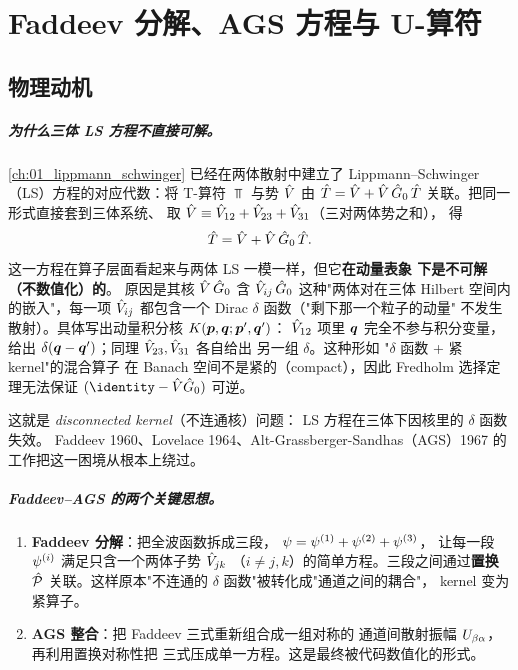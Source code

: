 
\chapter{Faddeev 分解、AGS 方程与 U-算符}
\label{ch:04_faddeev_ags}

\section{物理动机}
\label{sec:ch04-motivation}

\paragraph{为什么三体 LS 方程不直接可解。}
\cref{ch:01_lippmann_schwinger} 已经在两体散射中建立了 Lippmann–Schwinger
（LS）方程的对应代数：将 T-算符 \(\Top\) 与势 \(\hat{V}\) 由
\(\hat{T} = \hat{V} + \hat{V}\,\hat{G}_0\,\hat{T}\) 关联。把同一形式直接套到三体系统、
取 \(\hat{V} \equiv \hat{V}_{12} + \hat{V}_{23} + \hat{V}_{31}\)（三对两体势之和），
得
\begin{equation}
\label{eq:ch04-LS-3body-naive}
\hat{T} = \hat{V} + \hat{V}\,\hat{G}_0\,\hat{T}.
\end{equation}
这一方程在算子层面看起来与两体 LS 一模一样，但它\textbf{在动量表象
下是不可解（不数值化）的}。
原因是其核 \(\hat{V}\,\hat{G}_0\) 含
\(\hat{V}_{ij}\,\hat{G}_0\) 这种"两体对在三体 Hilbert 空间内的嵌入"，每一项
\(\hat{V}_{ij}\) 都包含一个 Dirac \(\delta\) 函数（"剩下那一个粒子的动量"
不发生散射）。具体写出动量积分核 \(K(\bm{p}, \bm{q}; \bm{p}', \bm{q}')\)：
\(\hat{V}_{12}\) 项里 \(\bm{q}\) 完全不参与积分变量，给出
\(\delta(\bm{q} - \bm{q}')\)；同理 \(\hat{V}_{23}, \hat{V}_{31}\) 各自给出
另一组 \(\delta\)。这种形如 "\(\delta\) 函数 + 紧 kernel"的混合算子
在 Banach 空间不是紧的（compact），因此 Fredholm 选择定理无法保证
\((\identity - \Vop \Gzero)\) 可逆。

这就是 \emph{disconnected kernel}（不连通核）问题：
LS 方程在三体下因核里的 \(\delta\) 函数失效。
Faddeev 1960、Lovelace 1964、Alt-Grassberger-Sandhas（AGS）1967 的工作把这一困境从根本上绕过。

\paragraph{Faddeev–AGS 的两个关键思想。}
\begin{enumerate}
  \item \textbf{Faddeev 分解}：把全波函数拆成三段，
        \(\psi = \psi^{(1)} + \psi^{(2)} + \psi^{(3)}\)，
        让每一段 \(\psi^{(i)}\) 满足只含一个两体子势 \(\hat{V}_{jk}\)
        （\(i \neq j, k\)）的简单方程。三段之间通过\textbf{置换 \(\hat{\mathcal{P}}\)}
        关联。这样原本"不连通的 \(\delta\) 函数"被转化成"通道之间的耦合"，
        kernel 变为紧算子。
  \item \textbf{AGS 整合}：把 Faddeev 三式重新组合成一组对称的
        通道间散射振幅 \(U_{\beta\alpha}\)，再利用置换对称性把
        三式压成单一方程。这是最终被代码数值化的形式。
\end{enumerate}


